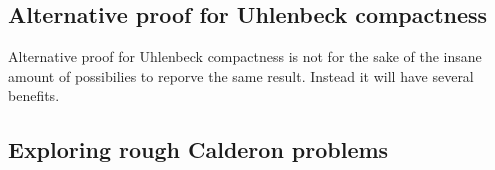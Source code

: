 \documentclass[12pt]{article}
\numberwithin{equation}{section}
\theoremstyle{definition}
\theoremstyle{remark}
\newcommand{\diff}{\mathrm{d}}
\newcommand{\1}{\mathbf 1}
\newcommand{\<}{\langle}
\renewcommand{\>}{\rangle}
\begin{document}




\subsection{Alternative proof for Uhlenbeck compactness}



Alternative proof for Uhlenbeck compactness is not for the sake of the insane amount of possibilies to reporve the same result. Instead it will have several benefits. 

\subsection{Exploring rough Calderon problems}




\end{document}

